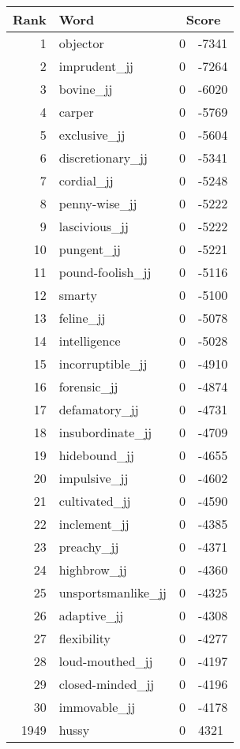 \begin{longtable}[!htbp]{| rlr@{.}l |}
    \hline
    \textbf{Rank} & \textbf{Word} & \multicolumn{2}{c|}{\textbf{Score}} \\
    \hline
    \endhead
    1 & objector & 0 & -7341 \\
    2 & imprudent\_jj & 0 & -7264 \\
    3 & bovine\_jj & 0 & -6020 \\
    4 & carper & 0 & -5769 \\
    5 & exclusive\_jj & 0 & -5604 \\
    6 & discretionary\_jj & 0 & -5341 \\
    7 & cordial\_jj & 0 & -5248 \\
    8 & penny-wise\_jj & 0 & -5222 \\
    9 & lascivious\_jj & 0 & -5222 \\
    10 & pungent\_jj & 0 & -5221 \\
    11 & pound-foolish\_jj & 0 & -5116 \\
    12 & smarty & 0 & -5100 \\
    13 & feline\_jj & 0 & -5078 \\
    14 & intelligence & 0 & -5028 \\
    15 & incorruptible\_jj & 0 & -4910 \\
    16 & forensic\_jj & 0 & -4874 \\
    17 & defamatory\_jj & 0 & -4731 \\
    18 & insubordinate\_jj & 0 & -4709 \\
    19 & hidebound\_jj & 0 & -4655 \\
    20 & impulsive\_jj & 0 & -4602 \\
    21 & cultivated\_jj & 0 & -4590 \\
    22 & inclement\_jj & 0 & -4385 \\
    23 & preachy\_jj & 0 & -4371 \\
    24 & highbrow\_jj & 0 & -4360 \\
    25 & unsportsmanlike\_jj & 0 & -4325 \\
    26 & adaptive\_jj & 0 & -4308 \\
    27 & flexibility & 0 & -4277 \\
    28 & loud-mouthed\_jj & 0 & -4197 \\
    29 & closed-minded\_jj & 0 & -4196 \\
    30 & immovable\_jj & 0 & -4178 \\
    1949 & hussy & 0 & 4321 \\

\end{longtable}
